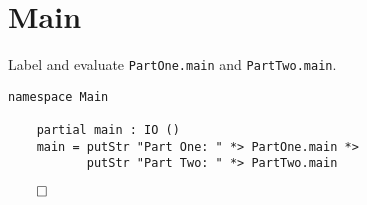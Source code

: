 \documentclass[b5paper,twoside]{amsbook}
\begin{document}
\newpage

\section{Main}\label{main}

Label and evaluate \texttt{PartOne.main} and
\texttt{PartTwo.main}.

\begin{verbatim}
namespace Main

    partial main : IO ()
    main = putStr "Part One: " *> PartOne.main *>
           putStr "Part Two: " *> PartTwo.main
\end{verbatim}

\(\qed\)
\end{document}

